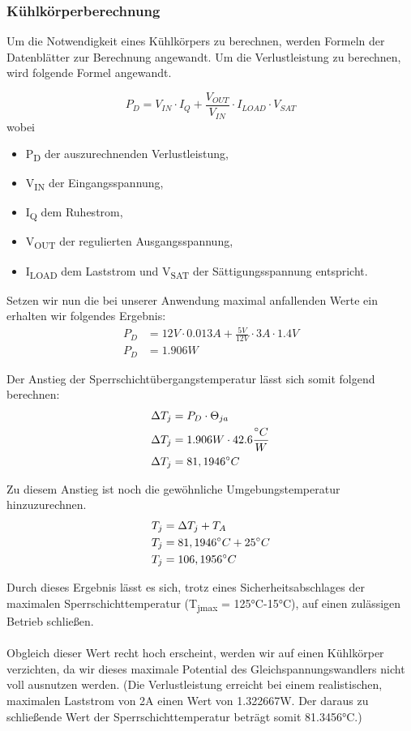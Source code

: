 \subsubsection{Kühlkörperberechnung}

Um die Notwendigkeit eines Kühlkörpers zu berechnen, werden Formeln der Datenblätter zur Berechnung angewandt.
Um die Verlustleistung zu berechnen, wird folgende Formel angewandt.

\begin{equation}
    P_D = V_{IN} \cdot I_Q + \frac{V_{OUT}}{V_{IN}} \cdot I_{LOAD} \cdot V_{SAT}
\end{equation}
wobei
\begin{itemize}
\item P\textsubscript{D} der auszurechnenden Verlustleistung,
\item V\textsubscript{IN} der Eingangsspannung,
\item I\textsubscript{Q} dem Ruhestrom,
\item V\textsubscript{OUT} der regulierten Ausgangsspannung,
\item I\textsubscript{LOAD} dem Laststrom und V\textsubscript{SAT} der Sättigungsspannung entspricht.
\end{itemize}

Setzen wir nun die bei unserer Anwendung maximal anfallenden Werte ein erhalten wir folgendes Ergebnis:
\begin{align*}
P_D &= 12V \cdot 0.013A + \frac{5V}{12V} \cdot 3A \cdot 1.4V \\
P_D &= 1.906W
\end{align*}

Der Anstieg der Sperrschichtübergangstemperatur lässt sich somit folgend berechnen:
\begin{align}
\Delta T_j &= P_D \cdot \Theta_{ja} \\
\Delta T_j &= 1.906W \cdot 42.6\frac{{}^{\circ}C}{W} \notag \\
\Delta T_j &= 81,1946^{\circ}C \notag
\end{align}

Zu diesem Anstieg ist noch die gewöhnliche Umgebungstemperatur hinzuzurechnen.
\begin{align}
T_j &= \Delta  T_j + T_A \\
T_j &= 81,1946^{\circ}C + 25^{\circ}C \notag \\
T_j &= 106,1956^{\circ}C \notag
\end{align}

Durch dieses Ergebnis lässt es sich, trotz eines Sicherheitsabschlages der maximalen Sperrschichttemperatur (T\textsubscript{jmax} = 125°C-15°C), auf einen zulässigen Betrieb schließen.\\\\
Obgleich dieser Wert recht hoch erscheint, werden wir auf einen Kühlkörper verzichten, da wir dieses maximale Potential des Gleichspannungswandlers nicht voll ausnutzen werden.
(Die Verlustleistung erreicht bei einem realistischen, maximalen Laststrom von 2A einen Wert von 1.322667W. Der daraus zu schließende Wert der Sperrschichttemperatur beträgt somit 81.3456°C.)

